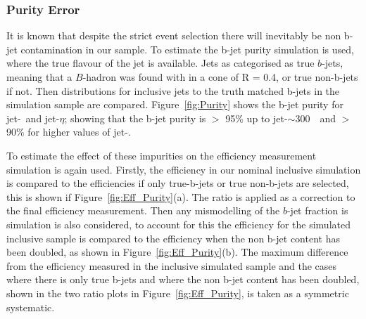 \subsubsection{Purity Error}
\label{sec:trig-purity}

It is known that despite the strict event selection there will inevitably be non b-jet contamination in our sample.
To estimate the b-jet purity simulation is used, where the true flavour of the jet is available.
Jets as categorised as true $b$-jets, meaning that a $B$-hadron was found with in a cone of R = 0.4, or true non-b-jets if not.
Then distributions for inclusive jets to the truth matched b-jets in the simulation sample are compared.
Figure~\ref{fig:Purity} shows the b-jet purity for jet-\pT~and jet-$\eta$;
showing that the b-jet purity is $>$ 95\% up to jet-\pT$\sim$300~\GeV~and $>$ 90\% for higher values of jet-\pT.

To estimate the effect of these impurities on the efficiency measurement simulation is again used.
Firstly, the efficiency in our nominal inclusive simulation is compared
to the efficiencies if only true-b-jets or true non-b-jets are selected,
this is shown if Figure~\ref{fig:Eff_Purity}(a).
The ratio is applied as a correction to the final efficiency measurement.
Then any mismodelling of the  $b$-jet fraction is simulation is also considered,
to account for this the efficiency for the simulated inclusive sample is compared to the efficiency when the non b-jet content has been doubled, as shown in Figure~\ref{fig:Eff_Purity}(b).
The maximum difference from the efficiency measured in the inclusive simulated sample and the cases
where there is only true b-jets and where the non b-jet content has been doubled,
shown in the two ratio plots in Figure~\ref{fig:Eff_Purity}, is taken as a symmetric systematic.

